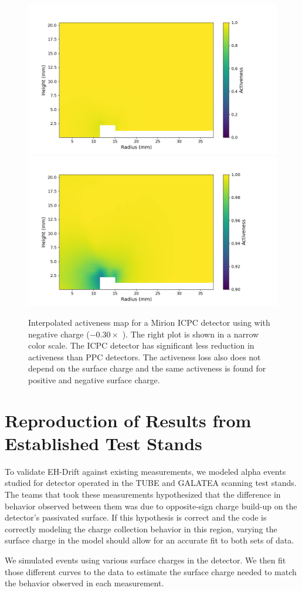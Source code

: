 \begin{figure}%
\centering
\includegraphics[trim={1.0cm 0cm 3.0cm 1cm},clip,width=0.49\linewidth]{ch5/figs/activeness_map_cubic_sc=-0.3_V07647A_5000_linear_full.png}
\includegraphics[trim={1.0cm 0cm 3cm 1cm},clip,width=0.49\linewidth]{ch5/figs/activeness_map_cubic_sc=-0.3_V07647A_5000_linear.png}
\caption{Interpolated activeness map for a Mirion ICPC detector using \ehd with negative charge ($-0.30 \times$ {\scunit}). The right plot is shown in a narrow color scale. The ICPC detector has significant less reduction in activeness than PPC detectors. The activeness loss also does not depend on the surface charge and the same activeness is found for positive and negative surface charge.}
\label{ch5_fig_interpolated_icpc_activeness_map}
\end{figure}


\section{\label{res:1} Reproduction of Results from Established Test Stands}
To validate EH-Drift against existing measurements, we modeled alpha events studied for {\ponama} detector operated in the TUBE \cite{TUBE_paper} and GALATEA \cite{galatea_paper} scanning test stands. The teams that took these measurements hypothesized that the difference in behavior observed between them was due to opposite-sign charge build-up on the detector's passivated surface. If this hypothesis is correct and the {\ehd} code is correctly modeling the charge collection behavior in this region, varying the surface charge in the model should allow for an accurate fit to both sets of data.

We simulated events using various surface charges in the {\ponama} detector. We then fit those different curves to the data to estimate the surface charge needed to match the behavior observed in each measurement.

